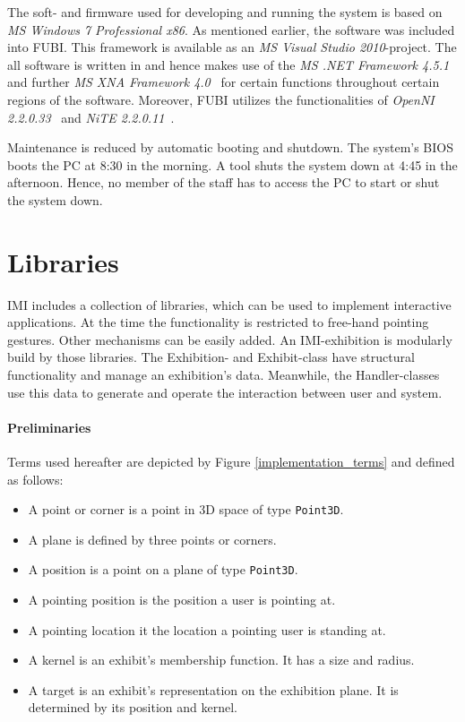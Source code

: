 The soft- and firmware used for developing and running the system is based on \textit{\ac{MS} Windows 7 Professional x86}. As mentioned earlier, the software was included into \ac{FUBI}. This framework is available as an \textit{\ac{MS} Visual Studio 2010}-project. The all software is written in  and hence makes use of the \textit{\ac{MS} .NET Framework 4.5.1}~\cite{MSNET} and further \textit{\ac{MS} XNA Framework 4.0}~\cite{MSXNA} for certain functions throughout certain regions of the software. Moreover, \ac{FUBI} utilizes the functionalities of \textit{OpenNI 2.2.0.33}~\cite{OpenNI} and \textit{NiTE 2.2.0.11}~\cite{NiTE}.

Maintenance is reduced by automatic booting and shutdown. The system's BIOS boots the PC at 8:30 in the morning. A tool shuts the system down at 4:45 in the afternoon. Hence, no member of the staff has to access the PC to start or shut the system down.


\section{Libraries}
\label{implementation_libraries}

\ac{IMI} includes a collection of libraries, which can be used to implement interactive applications. At the time the functionality is restricted to free-hand pointing gestures. Other mechanisms can be easily added. An \ac{IMI}-exhibition is modularly build by those libraries. The Exhibition- and Exhibit-class have structural functionality and manage an exhibition's data. Meanwhile, the Handler-classes use this data to generate and operate the interaction between user and system.

\paragraph{Preliminaries} Terms used hereafter are depicted by Figure \ref{implementation_terms} and defined as follows:
\begin{itemize}
	\item A point or corner is a point in \ac{3D} space of type \texttt{Point3D}.
	\item A plane is defined by three points or corners. 
	\item A position is a point on a plane of type \texttt{Point3D}.
	\item A pointing position is the position a user is pointing at.
	\item A pointing location it the location a pointing user is standing at.
	\item A kernel is an exhibit's membership function. It has a size and radius.
	\item A target is an exhibit's representation on the exhibition plane. It is determined by its position and kernel.
\end{itemize}

